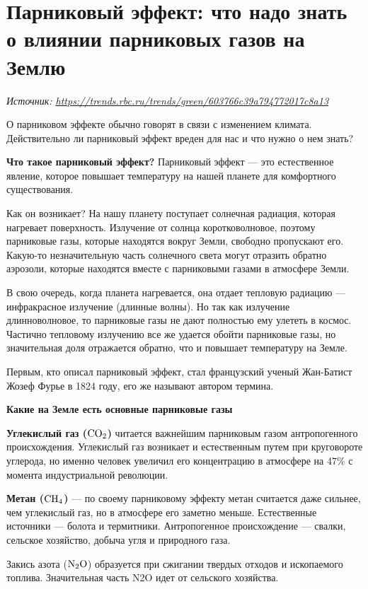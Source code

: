 \section[Парниковый эффект]{Парниковый эффект: что надо знать о влиянии парниковых газов на Землю}

\textit{Источник: \url{https://trends.rbc.ru/trends/green/603766c39a794772017c8a13}}

О парниковом эффекте обычно говорят в связи с изменением климата. Действительно ли парниковый эффект вреден для нас и что нужно о нем знать?

\textbf{Что такое парниковый эффект?}
Парниковый эффект — это естественное явление, которое повышает температуру на нашей планете для комфортного существования.

Как он возникает? На нашу планету поступает солнечная радиация, которая нагревает поверхность. Излучение от солнца коротковолновое, поэтому парниковые газы, которые находятся вокруг Земли, свободно пропускают его. Какую-то незначительную часть солнечного света могут отразить обратно аэрозоли, которые находятся вместе с парниковыми газами в атмосфере Земли.

В свою очередь, когда планета нагревается, она отдает тепловую радиацию — инфракрасное излучение (длинные волны). Но так как излучение длинноволновое, то парниковые газы не дают полностью ему улететь в космос. Частично тепловому излучению все же удается обойти парниковые газы, но значительная доля отражается обратно, что и повышает температуру на Земле.

Первым, кто описал парниковый эффект, стал французский ученый Жан-Батист Жозеф Фурье в 1824 году, его же называют автором термина.


\textbf{Какие на Земле есть основные парниковые газы}

\textbf{Углекислый газ ($\rm{CO}_2$)}
читается важнейшим парниковым газом антропогенного происхождения. Углекислый газ возникает и естественным путем при круговороте углерода, но именно человек увеличил его концентрацию в атмосфере на 47\% с момента индустриальной революции.

\textbf{Метан ($\rm{CH}_4$)} — по своему парниковому эффекту метан считается даже сильнее, чем углекислый газ, но в атмосфере его заметно меньше. Естественные источники — болота и термитники. Антропогенное происхождение — свалки, сельское хозяйство, добыча угля и природного газа.

Закись азота ($\rm{N}_2\rm{O}$) образуется при сжигании твердых отходов и ископаемого топлива. Значительная часть N2O идет от сельского хозяйства.

